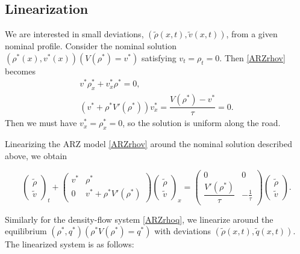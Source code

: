 \documentclass[5p,twocolumn]{elsarticle}
\begin{document}
\subsection{Linearization}
We are interested in small deviations, $(\tilde{\rho}(x,t), \tilde{v}(x,t))$, from a given nominal profile. Consider the nominal solution $(\rho^*(x),v^*(x))(V(\rho^*) = v^*)$ satisfying $v_t = \rho_t = 0$. Then \eqref{ARZrhov} becomes
\begin{align}
v^* \rho^*_x + v^*_x\rho^* = 0, \\
( v^* + \rho^* V'( \rho^*) )v^*_x = \dfrac{V(\rho^*) - v^*}{\tau} = 0.
\end{align}
Then we must have $v^*_x=\rho^*_x=0$, so the solution is uniform along the road. 

Linearizing the ARZ model \eqref{ARZrhov} around the nominal solution described above, we obtain

{
\footnotesize
\begin{equation} \label{rhovlin}
\begin{pmatrix}
\tilde{\rho} \\ \tilde{v}
\end{pmatrix}_t
+ \begin{pmatrix}
v^* & \rho^* \\
0 & v^* + \rho^* V' ( \rho^*) 
\end{pmatrix}
\begin{pmatrix}
\tilde{\rho} \\ \tilde{v}
\end{pmatrix}_x = 
\begin{pmatrix}
0 & 0 \\
\dfrac{V' (\rho^*)}{\tau} & -\frac{1}{\tau}
\end{pmatrix}
\begin{pmatrix}
\tilde{\rho} \\ \tilde{v}
\end{pmatrix}.
\end{equation}
}

Similarly for the density-flow system \eqref{ARZrhoq}, we linearize around the equilibrium $(\rho^*, q^*)(\rho^*V(\rho^*) = q^*)$ with deviations $(\tilde{\rho}(x,t), \tilde{q}(x,t))$. The linearized system is as follows:  
\end{document}
